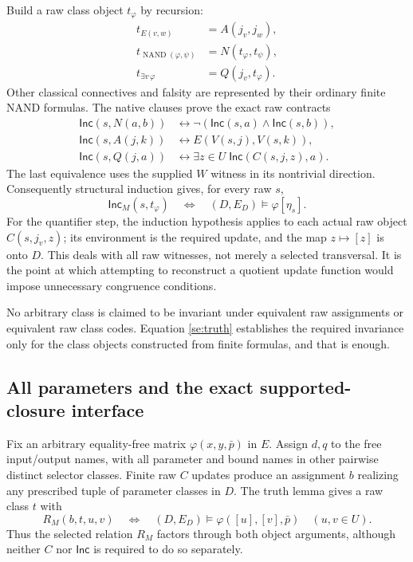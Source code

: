 Build a raw class object $t_\varphi$ by recursion:
\begin{align*}
 t_{E(v,w)}&=A(j_v,j_w),\\
 t_{\operatorname{NAND}(\varphi,\psi)}&=N(t_\varphi,t_\psi),\\
 t_{\exists v\,\varphi}&=Q(j_v,t_\varphi).
\end{align*}
Other classical connectives and falsity are represented by their ordinary
finite NAND formulas. The native clauses prove the exact raw contracts
\begin{align*}
 \mathsf{Inc}(s,N(a,b))&\leftrightarrow
   \neg(\mathsf{Inc}(s,a)\land\mathsf{Inc}(s,b)),\\
 \mathsf{Inc}(s,A(j,k))&\leftrightarrow E(V(s,j),V(s,k)),\\
 \mathsf{Inc}(s,Q(j,a))&\leftrightarrow
   \exists z\in U\;\mathsf{Inc}(C(s,j,z),a).
\end{align*}
The last equivalence uses the supplied $W$ witness in its nontrivial
direction. Consequently structural induction gives, for every raw $s$,
\begin{equation}
 \mathsf{Inc}_M(s,t_\varphi)
 \quad\Longleftrightarrow\quad
 (D,E_D)\models\varphi[\eta_s].
 \label{se:truth}
\end{equation}
For the quantifier step, the induction hypothesis applies to each actual
raw object $C(s,j_v,z)$; its environment is the required update, and
the map $z\mapsto[z]$ is onto $D$. This deals with all raw witnesses,
not merely a selected transversal. It is the point at which attempting
to reconstruct a quotient update function would impose unnecessary
congruence conditions.

No arbitrary class is claimed to be invariant under equivalent raw
assignments or equivalent raw class codes. Equation \eqref{se:truth}
establishes the required invariance only for the class objects constructed
from finite formulas, and that is enough.

\subsection{All parameters and the exact supported-closure interface}

Fix an arbitrary equality-free matrix $\varphi(x,y,\bar p)$ in $E$.
Assign $d,q$ to the free input/output names, with all parameter and bound
names in other pairwise distinct selector classes. Finite raw $C$
updates produce an assignment $b$ realizing any prescribed tuple of
parameter classes in $D$. The truth lemma gives a raw class $t$ with
\begin{equation}
 R_M(b,t,u,v)
 \quad\Longleftrightarrow\quad
 (D,E_D)\models\varphi([u],[v],\bar p)
 \quad(u,v\in U).
 \label{se:r}
\end{equation}
Thus the selected relation $R_M$ factors through both object arguments,
although neither $C$ nor $\mathsf{Inc}$ is required to do so separately.

